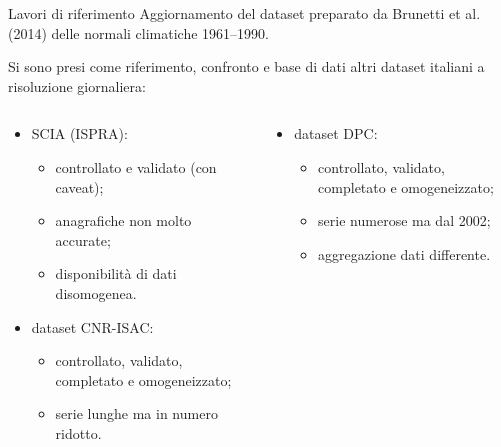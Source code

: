 \begin{frame}{Lavori di riferimento}
  Aggiornamento del dataset preparato da Brunetti et al. (2014) delle normali climatiche 1961--1990.

  Si sono presi come riferimento, confronto e base di dati altri dataset italiani a risoluzione giornaliera:
  \begin{columns}[t]
    \begin{column}{0.55\textwidth}
      \begin{itemize}
        \item SCIA (ISPRA):
          \begin{itemize}
            \item controllato e validato (con caveat);
            \item anagrafiche non molto accurate;
            \item disponibilità di dati disomogenea.
          \end{itemize}
        \item dataset CNR-ISAC:
          \begin{itemize}
            \item controllato, validato, completato e omogeneizzato;
            \item serie lunghe ma in numero ridotto.
          \end{itemize}
      \end{itemize}
    \end{column}
    \begin{column}{0.45\textwidth}
      \begin{itemize}
        \item dataset DPC:
          \begin{itemize}
            \item controllato, validato, completato e omogeneizzato;
            \item serie numerose ma dal 2002;
            \item aggregazione dati differente.
          \end{itemize}
      \end{itemize}
    \end{column}
  \end{columns}
\end{frame}